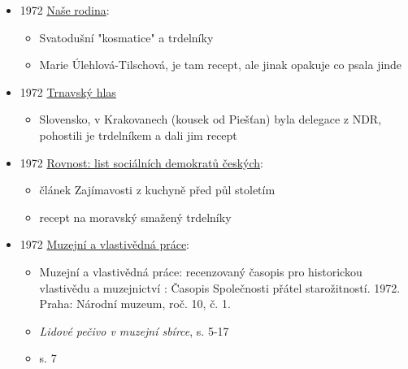 \begin{itemize}
  \begin{itemize}
  \tightlist
  \item
    beletrie, tetina specialita valašský trdelníky
  \end{itemize}
\item
  1972
  \href{https://ceskadigitalniknihovna.cz/view/uuid:8cf964a0-baf0-11e5-8c9e-001018b5eb5c?page=uuid\%3A13cfe450-bafa-11e5-82dc-5ef3fc9bb22f&fulltext=trdeln\%C3\%ADk\%20OR\%20trdeln\%C3\%ADky\%20OR\%20trdeln\%C3\%ADk\%C5\%AF&source=nkp}{Naše
  rodina}:

  \begin{itemize}
  \tightlist
  \item
    Svatodušní "kosmatice" a trdelníky
  \item
    Marie Úlehlová-Tilschová, je tam recept, ale jinak opakuje co psala
    jinde
  \end{itemize}
\item
  1972
  \href{https://dikda.snk.sk/uuid/uuid:0c6787b6-5b99-4d97-9642-caa75ca6d9be}{Trnavský
  hlas}

  \begin{itemize}
  \tightlist
  \item
    Slovensko, v Krakovanech (kousek od Piešťan) byla delegace z NDR,
    pohostili je trdelníkem a dali jim recept
  \end{itemize}
\item
  1972
  \href{https://ceskadigitalniknihovna.cz/view/uuid:aaca4510-b6b2-11ed-9ffb-5ef3fc9bb22f?page=uuid\%3Aea81fc20-c1fc-11ed-979d-5ef3fcdaa9a7&fulltext=trdeln\%C3\%ADk\%20OR\%20trdeln\%C3\%ADky\%20OR\%20trdeln\%C3\%ADk\%C5\%AF&source=mzk}{Rovnost:
  list sociálních demokratů českých}:

  \begin{itemize}
  \tightlist
  \item
    článek Zajímavosti z kuchyně před půl stoletím
  \item
    recept na moravský smažený trdelníky
  \end{itemize}
\item
  1972
  \href{https://ceskadigitalniknihovna.cz/uuid/uuid:f7dfd885-ee4d-4815-9bb8-26f566d50485}{Muzejní
  a vlastivědná práce}:

  \begin{itemize}
  \tightlist
  \item
    Muzejní a vlastivědná práce: recenzovaný časopis pro historickou
    vlastivědu a muzejnictví : Časopis Společnosti přátel starožitností.
    1972. Praha: Národní muzeum, roč. 10, č. 1.
  \item
    \emph{Lidové pečivo v muzejní sbírce}, 
    s. 5-17
  \item
    s. 7


\end{itemize}
\end{itemize}
